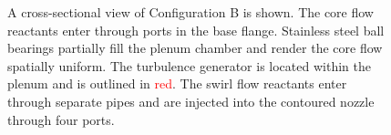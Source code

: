\begin{figure}

\caption[Detail schematic of Configuration B]{A cross-sectional view of Configuration B is shown. The core flow reactants enter through ports in the base flange. Stainless steel ball bearings partially fill the plenum chamber and render the core flow spatially uniform. The turbulence generator is located within the plenum and is outlined in \textcolor{red}{red}. The swirl flow reactants enter through separate pipes and are injected into the contoured nozzle through four ports.}

\label{fig:lsbB}

\end{figure}

